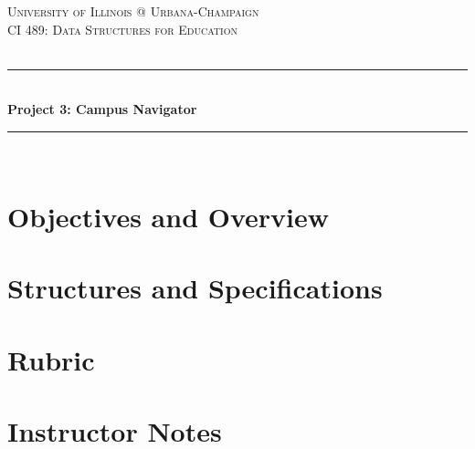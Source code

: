 \documentclass[a4paper]{article}
\begin{document}
\begin{titlepage}

\newcommand{\HRule}{\rule{\linewidth}{0.5mm}} 							%
\center 
 
\textsc{\LARGE University of Illinois @ Urbana-Champaign}\\[1cm]

\textsc{\Large CI 489: Data Structures for Education}\\[0.2cm]
\textsc{\large }\\[1cm] 										%
\HRule \\[0.8cm]
{ \huge \bfseries Project 3: Campus Navigator}\\[0.7cm]								%
\HRule \\[0.8cm]
\vfill
\vfill 
\end{titlepage}


\section*{Objectives and Overview}



\section*{Structures and Specifications}

\section*{Rubric}

\section*{Instructor Notes}
\end{document}
